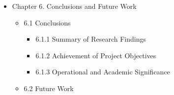 \begin{itemize}
  \begin{itemize}
  \tightlist
  \item
    5.1 Technical Evaluation and Robustness Assessment

    \begin{itemize}
    \tightlist
    \item
      5.1.1 Leakage Prevention Verification
    \item
      5.1.2 Calibration Validation and Threshold Robustness
    \item
      5.1.3 Temporal Generalisation Validation
    \end{itemize}
  \item
    5.2 Hypothesis Verification and Objective Alignment
  \item
    5.3 Error Analysis and Operational Interpretation

    \begin{itemize}
    \tightlist
    \item
      5.3.1 Confusion Matrix Breakdown
    \item
      5.3.2 False Negative Analysis
    \item
      5.3.3 False Positive Analysis
    \item
      5.3.4 Threshold Optimisation for Deployment
    \end{itemize}
  \item
    5.4 Validation Against Domain Knowledge
  \item
    5.5 Validation Constraints and Limitations
  \item
    5.6 Validation Outcome Summary
  \end{itemize}
\item
  Chapter 6. Conclusions and Future Work

  \begin{itemize}
  \tightlist
  \item
    6.1 Conclusions

    \begin{itemize}
    \tightlist
    \item
      6.1.1 Summary of Research Findings
    \item
      6.1.2 Achievement of Project Objectives
    \item
      6.1.3 Operational and Academic Significance
    \end{itemize}
  \item
    6.2 Future Work


\end{itemize}
\end{itemize}

